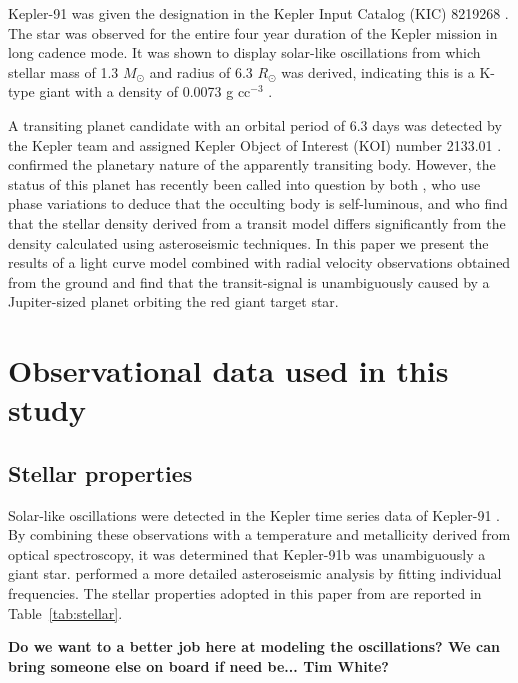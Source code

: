 \documentclass[apjl]{emulateapj}
\begin{document}
Kepler-91 was given the designation in the Kepler Input Catalog (KIC) 8219268 \citep{brown11}. The star was observed for the entire four year duration of the Kepler mission in long cadence mode. It was shown to display solar-like oscillations from which stellar mass of 1.3 $M_\odot$ and radius of 6.3 $R_\odot$ was derived, indicating this is a K-type giant with a density of 0.0073 g cc$^{-3}$ \citep{huber13,lillo13}.

A transiting planet candidate with an orbital period of 6.3 days was detected by the Kepler team and assigned Kepler Object of Interest (KOI) number 2133.01 \citep{batalha12}. \citet{lillo13} confirmed the planetary nature of the apparently transiting body. However, the status of this planet has recently been called into question by both \citet{esteves13}, who use phase variations to deduce that the occulting body is self-luminous, and \citet{sliski14} who find that the stellar density derived from a transit model differs significantly from the density calculated using asteroseismic techniques. In this paper we present the results of a light curve model combined with radial velocity observations obtained from the ground and find that the transit-signal is unambiguously caused by a Jupiter-sized planet orbiting the red giant target star.


\section{Observational data used in this study}

\subsection{Stellar properties}
Solar-like oscillations were detected in the Kepler time series data of Kepler-91 \citep{huber13}. By combining these observations with a temperature and metallicity derived from optical spectroscopy, it was determined that Kepler-91b was unambiguously a giant star. \citet{lillo13} performed a more detailed asteroseismic analysis by fitting individual frequencies. The stellar properties adopted in this paper from \citeauthor{lillo13} are reported in Table~\ref{tab:stellar}.

\textbf{Do we want to a better job here at modeling the oscillations? We can bring someone else on board if need be... Tim White?}
\end{document}
